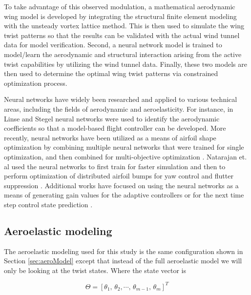 \documentclass[11pt]{ucthesis}
\begin{document}
To take advantage of this observed modulation, a mathematical aerodynamic wing model is developed by integrating the structural finite element modeling with the unsteady vortex lattice method. This is then used to simulate the wing twist patterns so that the results can be validated with the actual wind tunnel data for model verification. Second, a neural network model is trained to model/learn the aerodynamic and structural interaction arising from the active twist capabilities by utilizing the wind tunnel data. Finally, these two models are then used to determine the optimal wing twist patterns via constrained optimization process.

Neural networks have widely been researched and applied to various technical areas, including the fields of aerodynamic and aeroelasticity. For instance, in Linse and Stegel \cite{linse1993identification} neural networks were used to identify the aerodynamic coefficients so that a model-based flight controller can be developed. More recently, neural networks have been utilized as a means of airfoil shape optimization by combining multiple neural networks that were trained for single optimization, and then combined for multi-objective optimization \cite{rai2000improving,rai2002towards,rai2000aerodynamic}. Natarajan et. al \cite{natarajan2004aeroelastic, natarajan2002dynamic} used the neural networks to first train for faster simulation and then to perform optimization of distributed airfoil bumps for yaw control \cite{natarajan2004aeroelastic} and flutter suppression \cite{natarajan2002dynamic}. Additional works have focused on using the neural networks as a means of generating gain values for the adaptive controllers \cite{lakshmikanth2014adaptive} or for the next time step control state prediction \cite{wang2004time}.

\subsection{Aeroelastic modeling}

The aeroelastic modeling used for this study is the same configuration shown in Section \ref{sec:aeroModel} except that instead of the full aeroelastic model we will only be looking at the twist states. Where the state vector is 

\begin{equation}
\Theta = [\theta_1,\,\theta_2,\dotsb,\,\theta_{m-1},\,\theta_m]^T
\label{eqn:state}
\end{equation}
\end{document}
